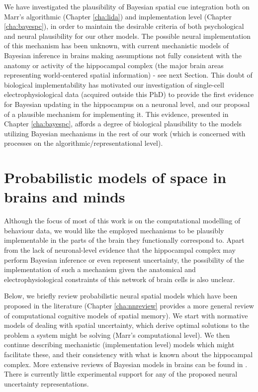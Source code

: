 We have investigated the plausibility of Bayesian spatial cue integration both on Marr's algorithmic (Chapter \ref{cha:lida}) and implementation level (Chapter \ref{cha:bayespc}), in order to maintain the desirable criteria of both psychological and neural plausibility for our other models. The possible neural implementation of this mechanism has been unknown, with current mechanistic models of Bayesian inference in brains making assumptions not fully consistent with the anatomy or activity of the hippocampal complex (the major brain areas representing world-centered spatial information) - see next Section. This doubt of biological implementability has motivated our investigation of single-cell electrophysiological data (acquired outside this PhD) to provide the first evidence for Bayesian updating in the hippocampus on a neuronal level, and our proposal of a plausible mechanism for implementing it. This evidence, presented in Chapter \ref{cha:bayespc}, affords a degree of biological plausibility to the models utilizing Bayesian mechanisms in the rest of our work (which is concerned with processes on the algorithmic/representational level).


\section{Probabilistic models of space in brains and minds}
\label{sec:intro:uncertaintybrain} 

Although the focus of most of this work is on the computational modelling of behaviour data, we would like the employed mechanisms to be plausibly implementable in the parts of the brain they functionally correspond to. Apart from the lack of neuronal-level evidence that the hippocampal complex may perform Bayesian inference or even represent uncertainty, the possibility of the implementation of such a mechanism given the anatomical and electrophysiological constraints of this network of brain cells is also unclear. 

Below, we briefly review probabilistic neural spatial models which have been proposed in the literature (Chapter \ref{cha:nnreview} provides a more general review of computational cognitive models of spatial memory). We start with normative models of dealing with spatial uncertainty, which derive optimal solutions to the problem a system might be solving (Marr's computational level). We then continue describing mechanistic (implementation level) models which might facilitate these, and their consistency with what is known about the hippocampal complex. More extensive reviews of Bayesian models in brains can be found in \citep{pouget2013probabilistic, vilares2011bayesian}. There is currently little experimental support for any of the proposed neural uncertainty representations. %

